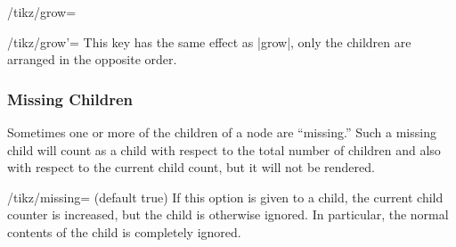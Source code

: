 \begin{key}{/tikz/grow=}
\begin{codeexample}[]
\end{codeexample}

\begin{codeexample}[]
\end{codeexample}
\end{key}

\begin{key}{/tikz/grow'=}
  This key has the same effect as |grow|, only the children are
  arranged in the opposite order.
\end{key}


\subsubsection{Missing Children}

Sometimes one or more of the children of a node are ``missing.'' Such
a missing child will count as a child with respect to the total number
of children and also with respect to the current child count, but it
will not be rendered.

\begin{key}{/tikz/missing= (default true)}
  If this option is given to a child, the current child counter is
  increased, but the child is otherwise ignored. In particular, the
  normal contents of the child is completely ignored.

\begin{codeexample}[]
\end{codeexample}
\end{key}


